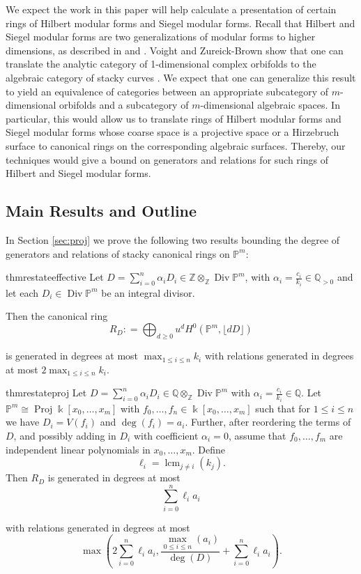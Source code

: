 \documentclass{amsart}
\theoremstyle{plain}
\theoremstyle{definition}
\theoremstyle{remark}
\numberwithin{equation}{section}
\newcommand\ssec{\subsection}
\newcommand\bq{{\mathbb Q}}
\newcommand\bp{{\mathbb P}}
\newcommand\bz{{\mathbb Z}}
\newcommand\bk{{\Bbbk}}
\DeclareMathOperator\di{Div}
\newcommand\bida{a}
\DeclareMathOperator{\proj}{Proj}
\DeclareMathOperator{\lcm}{lcm}
\begin{document}
We expect the work in this paper will help calculate a presentation of certain rings of
Hilbert 
modular forms and Siegel modular forms. Recall that Hilbert and Siegel 
modular forms are two generalizations of modular forms to higher dimensions,
as described in \cite{geer:siegel-modular} and \cite{bruinier:hilbert-modular}.
Voight and Zureick-Brown show that 
one can translate the analytic category of 1-dimensional complex orbifolds to
the algebraic category of stacky curves \cite[Proposition 6.1.5]{vzb:stacky}. 
We expect that one can generalize this result to yield an equivalence of
categories between an appropriate subcategory of $m$-dimensional orbifolds and
a subcategory of $m$-dimensional algebraic spaces.
In particular, this would allow us to translate rings of Hilbert modular forms
and Siegel modular forms whose coarse space is a projective space or a
Hirzebruch surface to canonical rings on the corresponding algebraic surfaces.
Thereby, our techniques would give a bound on generators and relations for such
rings of Hilbert and Siegel modular forms.

\ssec{Main Results and Outline}

In Section \ref{sec:proj} we prove the following two results bounding
the degree of generators and relations of
stacky canonical rings on $\bp^m$:
\begin{restatable}{thm}{restateeffective}
\label{thm:proj-effective-intro}
Let $D = \sum_{i = 0}^{n} \alpha_i D_i \in \bz \otimes_\bz \di \bp^m$, with $\alpha_i =
\frac{c_i}{k_i} \in \bq_{> 0}$ and let each $D_i \in \di \bp^m$ be an integral divisor.

Then the canonical ring
\[
	R_D \colon = \bigoplus_{d \geq 0} u^d H^0(\bp^m, \lfloor dD \rfloor)
\]

\noindent
is generated in degrees at most $\max_{1 \leq i \leq n}{k_i}$ with
relations generated in degrees at most $2 \max_{1 \leq i \leq n}{k_i}$.
\end{restatable}

\begin{restatable}{thm}{restateproj}
\label{thm:proj-generators-relations}
Let $D =
\sum_{i=0}^n \alpha_i D_i \in \bq \otimes_\bz \di \bp^m$ 
with $\alpha_i = \frac{c_i}{k_i}\in \bq.$ Let $\bp^m \cong \proj \bk[x_0,\ldots, x_m]$ with
$f_0, \ldots, f_n \in \bk[x_0, \ldots, x_m]$ such that
for $1 \leq i \leq n$ we have $D_i = V(f_i)$ and $\deg(f_i) = a_i.$
Further, after reordering the terms of $D$, and possibly adding in
$D_i$ with coefficient $\alpha_i = 0$, assume that $f_0,\ldots, f_m$ are independent linear
polynomials in $x_0, \ldots, x_m$. 
Define 
\[\ell_i = \lcm_{j\ne i}(k_j).\] 
Then $R_D$ is generated in degrees at most 
\[
	\sum_{i=0}^n \ell_i a_i
\]

\noindent
with relations generated in degrees at most
\[
	\max \left(2 \sum_{i=0}^n \ell_i a_i, \frac{\max_{0\le i \le n}
	(	\bida_i)}{\deg(D)} + \sum_{i=0}^n \ell_i a_i \right).
\]
\end{restatable}
\end{document}
